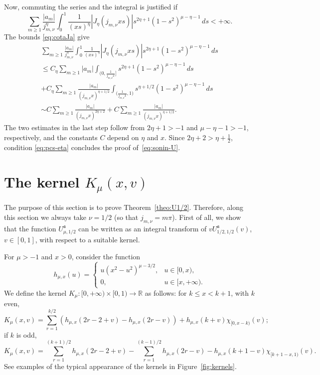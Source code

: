 \documentclass[10pt,a4paper]{article}
\numberwithin{equation}{section}
\theoremstyle{plain}
\theoremstyle{definition}
\newcommand{\aA}{\mathfrak{a}}
\newcommand{\RR}{\mathbb{R}}
\begin{document}
Now, commuting the series and the integral is justified if
\[
   \sum_{m\geq 1} \frac{|a_m|}{j_{m,\nu}^\eta}
   \int_0^1 \frac{1}{(xs)^\eta}
   |J_\eta(j_{m,\nu} xs)|
   s^{2\eta+1} (1-s^2)^{\mu-\eta-1} \, ds
   < +\infty.
\]
The bounds \eqref{eq:cotaJa} give
\begin{multline*}
   \sum_{m\geq 1} \frac{|a_m|}{j_{m,\nu}^\eta}
   \int_0^1 \frac{1}{(xs)^\eta}
   |J_\eta(j_{m,\nu} xs)|
   s^{2\eta+1} (1-s^2)^{\mu-\eta-1} \, ds
   \\
   \leq C_\eta \sum_{m\geq 1} |a_m| \int_{\big(0,\frac{1}{j_{m,\nu}x}\big]}
   s^{2\eta+1} (1-s^2)^{\mu-\eta-1} \, ds
   \\
   + C_\eta \sum_{m\geq 1} \frac{|a_m|}{(j_{m,\nu} x)^{\eta + 1/2}}
   \int_{\big(\frac{1}{j_{m,\nu}x},1\big)}
   s^{\eta+1/2} (1-s^2)^{\mu-\eta-1} \, ds
   \\
   \sim C \sum_{m\geq 1} \frac{|a_m|}{(j_{m,\nu}x)^{2\eta+2}}
   + C \sum_{m\geq 1} \frac{|a_m|}{(j_{m,\nu} x)^{\eta + 1/2}}.
\end{multline*}
The two estimates in the last step follow from $2\eta +1 > -1$ and $\mu - \eta -1 > -1$, respectively, and the constants $C$ depend on $\eta$ and $x$. Since $2\eta + 2 > \eta + \frac{1}{2}$, condition \eqref{eq:pcs-eta} concludes the proof of~\eqref{eq:sonin-U}.

\section{The kernel $K_\mu(x,v)$}
\label{sec:kernel}

The purpose of this section is to prove Theorem~\ref{theo:U1/2}. Therefore, along this section we always take $\nu=1/2$ (so that $j_{m,\nu}=m\pi$).
First of all, we show that the function $U_{\mu,1/2}^{\aA}$ can be written as an integral transform of $vU_{1/2,1/2}^\aA(v)$, $v\in[0,1]$, with respect to a suitable kernel.

For $\mu>-1$ and $x> 0$, consider the function
\[
   h_{\mu,x} (u) =
   \begin{cases} u(x^2-u^2)^{\mu -3/2}, & u\in [0,x),\\
   0, & u\in [x,+\infty).
   \end{cases}
\]
We define the kernel $K_\mu:[0,+\infty)\times [0,1) \to \RR$ as follows:
for $k\le x<k+1$, with $k$ even,
\begin{equation}
\label{def:kerpar}
   K_\mu(x,v) = \sum_{r=1}^{k/2}(h_{\mu,x} (2r-2+v)-h_{\mu,x} (2r-v))
   + h_{\mu,x} (k+v)\chi_{[0,x-k)}(v);
\end{equation}
if $k$ is odd,
\begin{equation}
\label{def:kerimpar}
   K_\mu(x,v) = \sum_{r=1}^{(k+1)/2}h_{\mu,x} (2r-2+v)
   - \sum_{r=1}^{(k-1)/2}h_{\mu,x} (2r-v)-h_{\mu,x} (k+1-v)\chi_{[k+1-x,1)}(v).
\end{equation}
See examples of the typical appearance of the kernels in Figure~\ref{fig:kernels}.
\end{document}
